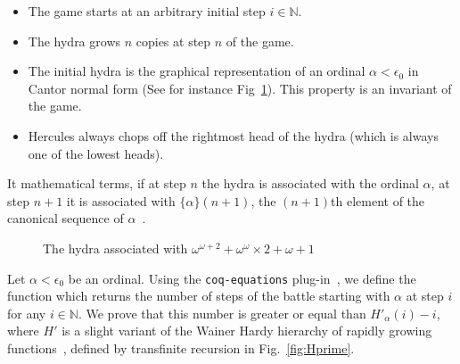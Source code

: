 \documentclass{easychair}
\newcommand{\canonseq}[2]{\mbox{$\{#1\}(#2)$}}
\begin{document}
 \begin{itemize}
 \item The game starts at an arbitrary initial step $i\in\mathbb{N}$.
   
   \item The hydra grows $n$ copies at step $n$ of the game.
   \item  The initial hydra is the graphical representation of an ordinal  $\alpha<\epsilon_0$  in Cantor normal form (See for instance Fig~\ref{fig:iota-example}). This property is an invariant of the game.
 \item Hercules always chops off the rightmost head of the hydra (which is always one of the lowest heads).
 \end{itemize}
 It mathematical terms, if at step $n$ the hydra is associated with the ordinal $\alpha$, at step $n+1$ it is associated with
 $\canonseq{\alpha}{n+1}$, the $(n+1)$th element of the canonical sequence of $\alpha$~\cite{KS81}.
 
 

   \begin{figure}[htb]
\centering
{}
\caption{The hydra associated with $\omega^{\omega+2}+\omega^\omega \times 2 + \omega + 1$ \label{fig:iota-example}}

\end{figure}

Let $\alpha<\epsilon_0$ be an ordinal.
Using the \texttt{coq-equations} plug-in~\cite{sozeau:hal-01671777}, we define the function which returns the number of steps of the battle starting with $\alpha$ at step $i$ for  any $i\in\mathbb{N}$.
We prove that this number is greater or equal than
$H'_\alpha(i)-i$, where $H'$ is a slight variant of the Wainer Hardy hierarchy of rapidly growing functions~\cite{BW85, KS81, Promel2013, Wainer1970}, defined by transfinite recursion in Fig.~\ref{fig:Hprime}.
\end{document}
